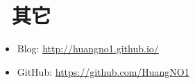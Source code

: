 \documentclass[10pt, a4paper]{article}
\begin{document}





\section{\color{CVBlue}\faInfo\ 其它}
\begin{itemize}[parsep=0.5ex]
  \item Blog: \href{http://huangno1.github.io/}{http://huangno1.github.io/}
  \item GitHub: \href{https://github.com/HuangNO1}{https://github.com/HuangNO1}
\end{itemize}
\end{document}
